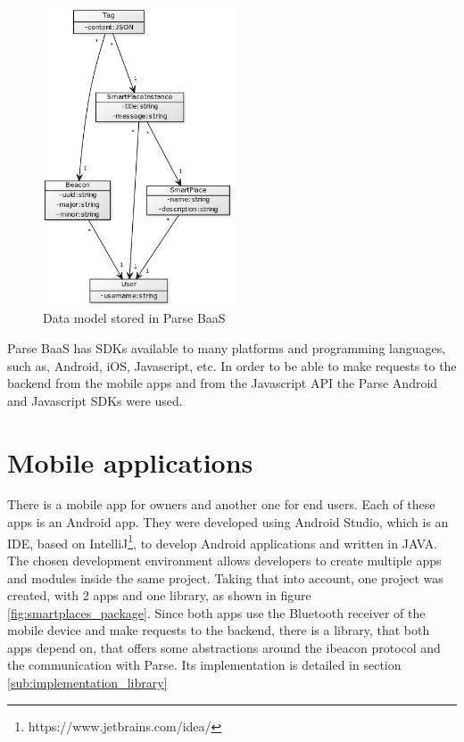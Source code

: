 \begin{figure}[!ht]
  \centering
    \includegraphics[width=0.5\textwidth]{images/backend_data_model}
    \caption[Data model]{Data model stored in Parse \gls{BaaS}}
    \label{fig:backend_data_model}
\end{figure}

Parse \gls{BaaS} has \glspl{SDK} available to many platforms and programming
languages, such as, Android, iOS, Javascript, etc.
In order to be able to make requests to the backend from the mobile apps and
from the Javascript API
the Parse Android and Javascript \glspl{SDK} were used.

\section{Mobile applications}
\label{sec:mobile_applications}
There is a mobile app for owners and another one for end users.
Each of these apps is an Android app. They were developed using Android
Studio, which is an \gls{IDE}, based on
IntelliJ\footnote{https://www.jetbrains.com/idea/},
to develop Android
applications and written in JAVA.
The chosen development environment allows developers to create multiple
apps and modules inside the same project.
Taking that into account,
one project was created, with 2 apps and one library, as shown in figure
\ref{fig:smartplaces_package}. Since both apps use the Bluetooth receiver
of the mobile device and make requests to the backend, there is a library,
that both apps depend on, that offers some abstractions around the ibeacon
protocol and the communication with Parse.
Its implementation is detailed in section \ref{sub:implementation_library}

